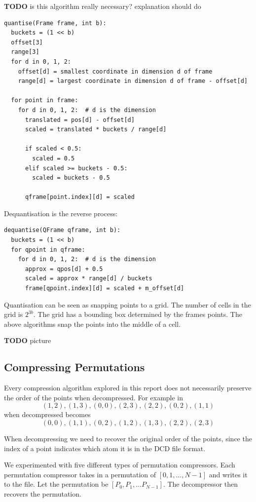 \documentclass{report}
\newcommand{\todo}{\textbf{TODO} }
\begin{document}
\todo is this algorithm really necessary? explanation should do
\begin{verbatim}
quantise(Frame frame, int b):
  buckets = (1 << b)
  offset[3]
  range[3]
  for d in 0, 1, 2:
    offset[d] = smallest coordinate in dimension d of frame
    range[d] = largest coordinate in dimension d of frame - offset[d]
  
  for point in frame:
    for d in 0, 1, 2:  # d is the dimension
      translated = pos[d] - offset[d]
      scaled = translated * buckets / range[d]
  
      if scaled < 0.5:
        scaled = 0.5
      elif scaled >= buckets - 0.5:
        scaled = buckets - 0.5
  
      qframe[point.index][d] = scaled
\end{verbatim}

\noindent Dequantisation is the reverse process:

\begin{verbatim}
dequantise(QFrame qframe, int b):
  buckets = (1 << b)
  for qpoint in qframe:
    for d in 0, 1, 2:  # d is the dimension
      approx = qpos[d] + 0.5
      scaled = approx * range[d] / buckets
      frame[qpoint.index][d] = scaled + m_offset[d]
\end{verbatim}

Quantisation can be seen as snapping points to a grid. The number of cells in
the grid is $2^{3b}$. The grid has a bounding box determined by the frames
points. The above algorithms snap the points into the middle of a cell.

\todo picture

\subsection{Compressing Permutations}

Every compression algorithm explored in this report does not necessarily
preserve the order of the points when decompressed. For example in
\cite{devillers2000gci}
\[ (1, 2), (1, 3), (0, 0), (2, 3), (2, 2), (0, 2), (1, 1) \]
when decompressed becomes
\[ (0, 0), (1, 1), (0, 2), (1, 2), (1, 3), (2, 2), (2, 3) \]

When decompressing we need to recover the original order of the points, since
the index of a point indicates which atom it is in the DCD file format.

We experimented with five different types of permutation compressors. Each
permutation compressor takes in a permutation of $[0,1,\dots,N-1]$ and writes
it to the file. Let the permutation be $[P_0, P_1, \dots P_{N-1}]$.  The
decompressor then recovers the permutation.
\end{document}
